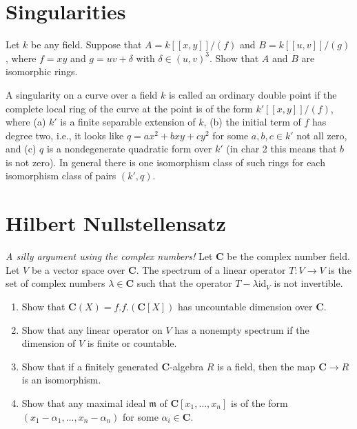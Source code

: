 \section{Singularities}
\label{section-singularities}

\begin{exercise}
\label{exercise-singularities}
Let $k$ be any field. Suppose that $A = k[[x, y]]/(f)$ and
$B = k[[u, v]]/(g)$, where $f = xy$ and $g = uv + \delta$ with
$\delta \in (u, v)^3$. Show that $A$ and $B$ are isomorphic rings.
\end{exercise}

\begin{remark}
\label{remark-singularities}
A singularity on a curve over a field $k$ is called an
ordinary double point if the complete local ring of the curve at the
point is of the form $k'[[x, y]]/(f)$, where (a) $k'$ is a finite separable
extension of $k$, (b) the initial term of $f$ has degree two, i.e., it
looks like $q = ax^2 + bxy + cy^2$ for some $a, b, c\in k'$ not all zero, and
(c) $q$ is a nondegenerate quadratic form over $k'$ (in char 2 this means that
$b$ is not zero). In general there is one isomorphism class of such rings for
each isomorphism class of pairs $(k', q)$.
\end{remark}






\section{Hilbert Nullstellensatz}
\label{section-Hilbert-Nullstellensatz}


\begin{exercise}
\label{exercise-uncountable}
{\it A silly argument using the complex numbers!}
Let ${\mathbf C}$ be the complex number field. Let $V$ be a vector
space over ${\mathbf C}$. The spectrum of a linear operator
$T : V \to V$ is the set of complex numbers $\lambda \in {\mathbf C}$
such that the operator $T - \lambda \text{id}_V$ is not invertible.
\begin{enumerate}
\item Show that ${\mathbf C}(X) = f.f.({\mathbf C}[X])$
has uncountable dimension over ${\mathbf C}$.
\item Show that any linear operator on $V$ has a
nonempty spectrum if the dimension of $V$ is finite or
countable.
\item Show that if a finitely generated ${\mathbf C}$-algebra
$R$ is a field, then the map ${\mathbf C}\to R$ is an isomorphism.
\item Show that any maximal ideal ${\mathfrak m}$ of
${\mathbf C}[x_1, \ldots, x_n]$ is of the form
$(x_1-\alpha_1, \ldots, x_n-\alpha_n)$ for some $\alpha_i \in {\mathbf C}$.
\end{enumerate}
\end{exercise}

